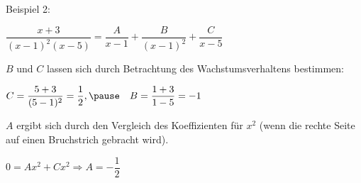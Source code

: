 \begin{frame}[fragile]
Beispiel 2:

$\dfrac{x+3}{(x-1)^2(x-5)} = \dfrac{A}{x-1} + \dfrac{B}{(x-1)^2} + \dfrac{C}{x-5}$ \pause

$B$ und $C$ lassen sich durch Betrachtung des Wachstumsverhaltens bestimmen: \pause

$C = \dfrac{5+3}{(5-1)^2} = \dfrac{1}{2}, \pause \quad B = \dfrac{1+3}{1-5} = -1$ \pause 

$A$ ergibt sich durch den Vergleich des Koeffizienten für $x^2$ (wenn die rechte Seite auf einen Bruchstrich gebracht wird). \pause

$0 = Ax^2 +Cx^2 \Rightarrow A = -\dfrac{1}{2}$
 
\end{frame}
 

